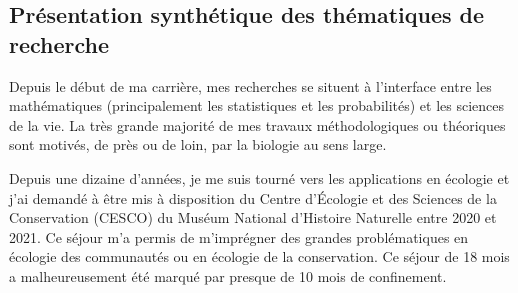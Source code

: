 \subsection{Présentation synthétique des thématiques de recherche}

Depuis le début de ma carrière, mes recherches se situent à l'interface entre les mathématiques (principalement les statistiques et les probabilités) et les sciences de la vie. La très grande majorité de mes travaux méthodologiques ou théoriques sont motivés, de près ou de loin, par la biologie au sens large. 


Depuis une dizaine d’années, je me suis tourné vers les applications en écologie et j'ai demandé à être mis à disposition du Centre d'Écologie et des Sciences de la Conservation (CESCO) du Muséum National d'Histoire Naturelle entre 2020 et 2021. Ce séjour m’a permis de m’imprégner des grandes problématiques en écologie des communautés ou en écologie de la conservation. Ce séjour de 18 mois a malheureusement été marqué par presque de 10 mois de confinement.

